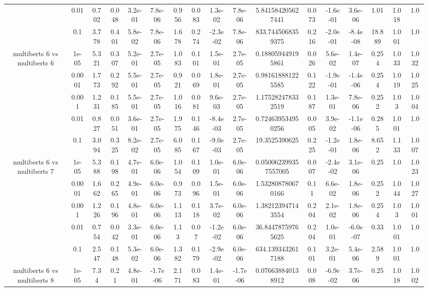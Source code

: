 \begin{tabular}{|c|c|c|c|c|c|c|c|c|c|c|c|c|c|c|c|c|}
 & 0.01 & 0.702 & 0.048 & 3.2e-01 & 7.8e-06 & 0.956 & 0.083 & 1.3e-02 & 7.8e-06 & 5.841584205627441 & 0.073 & -1.6e-01 & 3.6e-06 & 1.01 & 1.018 & 1.0 \\
 & 0.1 & 3.778 & 0.401 & 5.8e-02 & 7.8e-06 & 1.678 & 0.274 & -2.3e-02 & 7.8e-06 & 833.7445068359375 & 0.216 & -2.0e-01 & -8.4e-08 & 18.889 & 1.001 & 1.0 \\
\hline
\multirow{5}{*}{multiberts 6 vs multiberts 6} & 1e-05 & 5.321 & 0.307 & 5.2e-01 & 2.7e-05 & 1.083 & 0.101 & 1.5e-01 & 2.7e-05 & 0.188059449195861 & 0.026 & 5.6e-02 & 1.4e-07 & 0.254 & 1.033 & 1.032 \\
 & 0.0001 & 1.773 & 0.292 & 5.5e-01 & 2.7e-05 & 0.921 & 0.069 & 1.8e-01 & 2.7e-05 & 0.981618881225585 & 0.122 & -1.9e-01 & -1.4e-06 & 0.254 & 1.019 & 1.025 \\
 & 0.001 & 1.231 & 0.185 & 5.5e-01 & 2.7e-05 & 1.016 & 0.081 & 9.6e-03 & 2.7e-05 & 1.175282478332519 & 0.187 & 1.3e-01 & 7.8e-06 & 0.252 & 1.03 & 1.004 \\
 & 0.01 & 0.827 & 0.051 & 3.6e-01 & 2.7e-05 & 1.975 & 0.146 & -8.4e-03 & 2.7e-05 & 0.724639534950256 & 0.005 & 3.9e-02 & -1.1e-06 & 0.285 & 1.001 & 1.0 \\
 & 0.1 & 3.094 & 0.325 & 8.2e-02 & 2.7e-05 & 6.085 & 0.167 & -9.0e-03 & 2.7e-05 & 19.3525390625 & 0.225 & -1.2e-01 & 1.8e-06 & 8.652 & 1.133 & 1.007 \\
\hline
\multirow{5}{*}{multiberts 6 vs multiberts 7} & 1e-05 & 5.388 & 0.198 & 4.7e-01 & 6.0e-06 & 1.054 & 0.109 & 1.0e-01 & 6.0e-06 & 0.050062399357557005 & 0.007 & -2.4e-02 & 3.1e-06 & 0.25 & 1.0 & 1.023 \\
 & 0.0001 & 1.662 & 0.265 & 4.9e-01 & 6.0e-06 & 0.973 & 0.096 & 1.5e-01 & 6.0e-06 & 1.532808780670166 & 0.11 & 6.6e-02 & 1.8e-06 & 0.252 & 1.044 & 1.027 \\
 & 0.001 & 1.226 & 0.196 & 4.8e-01 & 6.0e-06 & 1.113 & 0.118 & 3.7e-02 & 6.0e-06 & 1.382123947143554 & 0.204 & 2.1e-02 & 1.8e-06 & 0.254 & 1.03 & 1.001 \\
 & 0.01 & 0.754 & 0.042 & 3.3e-01 & 6.0e-06 & 1.13 & 0.07 & -1.2e-02 & 6.0e-06 & 36.84478759765625 & 0.204 & 1.0e-01 & -6.0e-07 & 0.33 & 1.001 & 1.0 \\
 & 0.1 & 2.547 & 0.148 & 5.3e-02 & 6.0e-06 & 1.382 & 0.179 & -2.9e-02 & 6.0e-06 & 634.1393432617188 & 0.101 & 3.2e-01 & 5.4e-06 & 2.589 & 1.001 & 1.0 \\
\hline
\multirow{5}{*}{multiberts 6 vs multiberts 8} & 1e-05 & 7.34 & 0.21 & 4.8e-01 & -1.7e-06 & 2.171 & 0.083 & 1.4e-01 & -1.7e-06 & 0.076638840138912 & 0.008 & -6.9e-02 & 3.7e-06 & 0.25 & 1.018 & 1.002 \\

\end{tabular}

